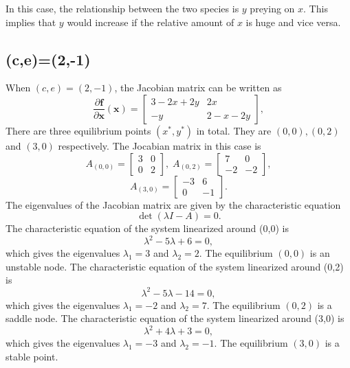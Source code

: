 \documentclass[a4paper,twocolumn]{article} %
\begin{document}
In this case, the relationship between the two species is $y$ preying on $x$. This implies that $y$ would increase if the relative amount of $x$ is huge and vice versa.

\subsection{(c,e)=(2,-1)}
When $(c,e)=(2,-1)$, the Jacobian matrix can be written as
\begin{equation*}
    \frac{\partial\textbf{f}}{\partial \textbf{x}}(\textbf{x}) =
    \left[\begin{array}{cc}
    3-2x+2y & 2x \\
    -y & 2-x-2y
    \end{array}\right],
\end{equation*}
There are three equilibrium points $(x^*,y^*)$ in total. They are $(0,0),(0,2)$ and $(3,0)$ respectively. The Jocabian matrix in this case is
\begin{equation*}
    A_{(0,0)} =
    \left[\begin{array}{cc}
    3 & 0 \\
    0 & 2
    \end{array}\right], \; A_{(0,2)} =
    \left[\begin{array}{cc}
    7 & 0 \\
    -2 & -2
    \end{array}\right],   
    \end{equation*}
    \begin{equation*}
    A_{(3,0)} =
    \left[\begin{array}{cc}
    -3 & 6 \\
    0 & -1
    \end{array}\right].
\end{equation*}
The eigenvalues of the Jacobian matrix are given by the characteristic equation
\begin{equation*}
    \det(\lambda I - A) = 0.
\end{equation*}
The characteristic equation of the system linearized around \mbox{(0,0)} is
\begin{equation*}
    \lambda^2 -5 \lambda + 6 = 0,
\end{equation*}
which gives the eigenvalues $\lambda_{1} = 3$ and $\lambda_{2} = 2$. The equilibrium $(0,0)$ is an unstable node. 
The characteristic equation of the system linearized around \mbox{(0,2)} is
\begin{equation*}
    \lambda^2 -5 \lambda - 14 = 0,
\end{equation*}
which gives the eigenvalues $\lambda_1 = -2$ and $\lambda_2 = 7$. The equilibrium $(0,2)$ is a saddle node. 
The characteristic equation of the system linearized around \mbox{(3,0)} is
\begin{equation*}
    \lambda^2 +4 \lambda + 3 = 0,
\end{equation*}
which gives the eigenvalues $\lambda_1 = -3$ and $\lambda_2 = -1$. The equilibrium $(3,0)$ is a stable point.
\end{document}

